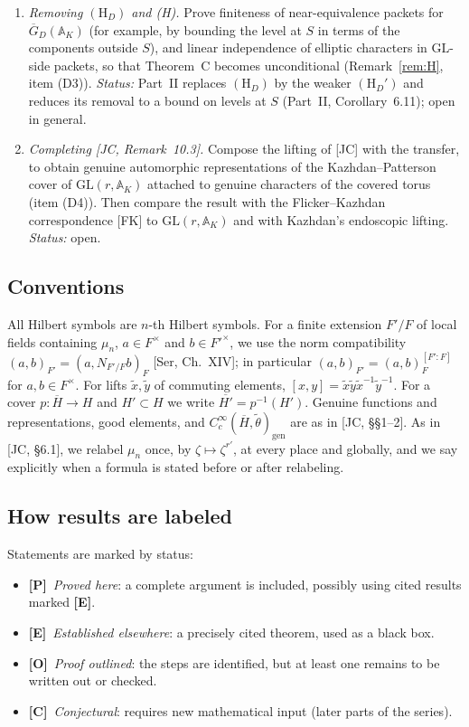 \documentclass[12pt]{article}
\newcommand{\ov}[1]{\overline{#1}}
\newcommand{\A}{\mathbb{A}}
\newcommand{\gen}{\mathrm{gen}}
\newcommand{\GL}{\mathrm{GL}}
\newcommand{\GDb}{\ov{G}_D}
\newcommand{\Pv}{\textbf{[P]}}
\newcommand{\Ev}{\textbf{[E]}}
\newcommand{\Ov}{\textbf{[O]}}
\newcommand{\Cv}{\textbf{[C]}}
\theoremstyle{plain}
\theoremstyle{definition}
\begin{document}
\begin{enumerate}[label=(\roman*)]
\item \emph{Removing $(\mathrm H_D)$ and (H).} Prove finiteness of near-equivalence packets for $\GDb(\A_K)$ (for example, by bounding the level at $S$ in terms of the components outside $S$), and linear independence of elliptic characters in $\GL$-side packets, so that Theorem~C becomes unconditional (Remark~\ref{rem:H}, item (D3)). \emph{Status:} Part~II replaces $(\mathrm H_D)$ by the weaker $(\mathrm H_D')$ and reduces its removal to a bound on levels at $S$ (Part~II, Corollary~6.11); open in general.
\item \emph{Completing [JC, Remark~10.3].} Compose the lifting of [JC] with the transfer, to obtain genuine automorphic representations of the Kazhdan--Patterson cover of $\GL(r,\A_K)$ attached to genuine characters of the covered torus (item (D4)). Then compare the result with the Flicker--Kazhdan correspondence [FK] to $\GL(r,\A_K)$ and with Kazhdan's endoscopic lifting. \emph{Status:} open.
\end{enumerate}

\subsection{Conventions}
All Hilbert symbols are $n$-th Hilbert symbols. For a finite extension $F'/F$ of local fields containing $\mu_n$, $a\in F^\times$ and $b\in F'^\times$, we use the norm compatibility $(a,b)_{F'}=(a,N_{F'/F}b)_F$ [Ser, Ch.~XIV]; in particular $(a,b)_{F'}=(a,b)_F^{[F':F]}$ for $a,b\in F^\times$. For lifts $\tilde x,\tilde y$ of commuting elements, $[x,y]=\tilde x\tilde y\tilde x^{-1}\tilde y^{-1}$. For a cover $p:\ov H\to H$ and $H'\subset H$ we write $\ov{H'}=p^{-1}(H')$. Genuine functions and representations, good elements, and $C_c^\infty(\ov H,\tilde\theta)_\gen$ are as in [JC, \S\S1--2]. As in [JC, \S6.1], we relabel $\mu_n$ once, by $\zeta\mapsto\zeta^{r'}$, at every place and globally, and we say explicitly when a formula is stated before or after relabeling.

\subsection{How results are labeled}
Statements are marked by status:
\begin{itemize}
\item \Pv\ \emph{Proved here}: a complete argument is included, possibly using cited results marked \Ev.
\item \Ev\ \emph{Established elsewhere}: a precisely cited theorem, used as a black box.
\item \Ov\ \emph{Proof outlined}: the steps are identified, but at least one remains to be written out or checked.
\item \Cv\ \emph{Conjectural}: requires new mathematical input (later parts of the series).
\end{itemize}
\end{document}
